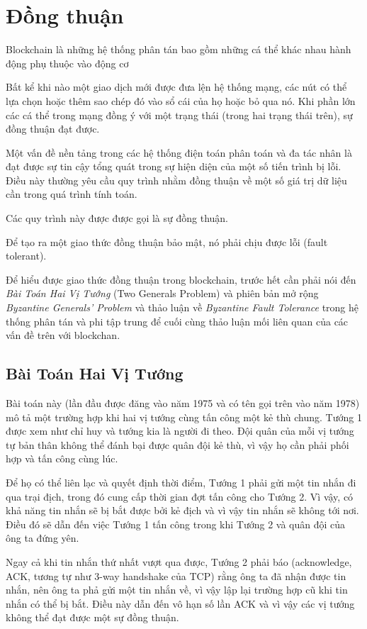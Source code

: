 \chapter{Đồng thuận }

Blockchain là những hệ thống phân tán bao gồm những cá thể khác nhau hành động phụ thuộc vào động cơ 

Bất kể khi nào một giao dịch mới được đưa lện hệ thống mạng, các nút có thể lựa chọn hoặc thêm sao chép đó vào sổ cái của họ hoặc bỏ qua nó. Khi phần lớn các cá thể trong mạng đồng ý với một trạng thái (trong hai trạng thái trên),  sự đồng thuận đạt được.

Một vấn đề nền tảng trong các hệ thống điện toán phân toán và đa tác nhân là đạt được sự tin cậy tổng quát trong sự hiện diện của một số tiến trình bị lỗi. Điều này thường yêu cầu quy trình nhằm đồng thuận về một số giá trị dữ liệu cần trong quá trình tính toán.

Các quy trình này được được gọi là sự đồng thuận.

Để tạo ra một giao thức đồng thuận bảo mật,  nó phải chịu được lỗi (fault tolerant).

Để hiểu được giao thức đồng thuận trong blockchain, trước hết cần phải nói đến \textit{Bài Toán Hai Vị Tướng} (Two Generals Problem) và phiên bản mở rộng \textit{Byzantine Generals’ Problem} và thảo luận về \textit{Byzantine Fault Tolerance} trong hệ thống phân tán và phi tập trung để cuối cùng thảo luận mối liên quan của các vấn đề trên với blockchan.

\section{Bài Toán Hai Vị Tướng}

Bài toán này (lần đầu được đăng vào năm 1975 và có tên gọi trên vào năm 1978) mô tả một trường hợp khi hai vị tướng cùng tấn công một kẻ thù chung. Tướng 1 được xem như chỉ huy và tướng kia là người đi theo. Đội quân của mỗi vị tướng tự bản thân không thể đánh bại được quân đội kẻ thù, vì vậy họ cần phải phối hợp và tấn công cùng lúc. 

Để họ có thể liên lạc và quyết định thời điểm, Tướng 1 phải gửi một tin nhắn đi qua trại địch, trong đó cung cấp thời gian đợt tấn công cho Tướng 2. Vì vậy, có khả năng tin nhắn sẽ bị bắt được bởi kẻ địch và vì vậy tin nhắn sẽ không tới nơi. Điều đó sẽ dẫn đến việc Tướng 1 tấn công trong khi Tướng 2 và quân đội của ông ta đứng yên.

Ngay cả khi tin nhắn thứ nhất vượt qua được, Tướng 2 phải báo (acknowledge, ACK, tương tự như 3-way handshake của TCP) rằng ông ta đã nhận được tin nhắn, nên ông ta phả gửi một tin nhắn về, vì vậy lập lại trường hợp cũ khi tin nhắn có thể bị bắt. Điều này dẫn đến vô hạn số lần ACK và vì vậy các vị tướng không thể đạt được một sự đồng thuận.

